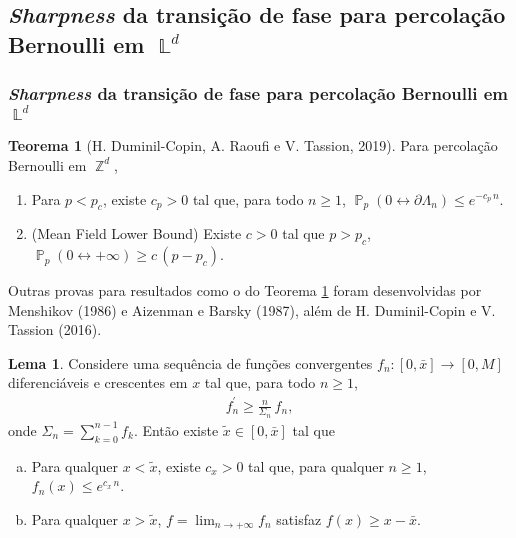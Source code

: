 \documentclass[9pt]{beamer}
\theoremstyle{definition} %
\newtheorem{mythm}{Teorema}
\newtheorem{mylem}{Lema}
\DeclareMathOperator{\PX}{\mathbb{P}} %
\DeclareMathOperator{\ZX}{\mathbb{Z}} %
\DeclareMathOperator{\LX}{\mathbb{L}} %
\begin{document}
	\subsection{\textit{Sharpness} da transição de fase para percolação Bernoulli em $\LX^d$}
	\begin{frame}[t]
		\frametitle{\textit{Sharpness} da transição de fase para percolação Bernoulli em $\LX^d$}
		\begin{mythm}[H. Duminil-Copin, A. Raoufi e V. Tassion, 2019]\label{thm:decai-exp}
			Para percolação Bernoulli em $\ZX^d$,
			\begin{enumerate}
				\item Para $p < p_c$, existe $c_p > 0$ tal que, para todo $n \geq 1$, $\PX_p(0 \leftrightarrow \partial\Lambda_n) \leq e^{-c_p \, n}$.
				\item (Mean Field Lower Bound) Existe $c > 0$ tal que $p > p_c$, $\PX_p(0 \leftrightarrow +\infty) \geq c\,(p - p_c)$.
			\end{enumerate}
		\end{mythm}
		\vspace{-3pt}
		Outras provas para resultados como o do Teorema \ref{thm:decai-exp} foram desenvolvidas por Menshikov (1986) e Aizenman e Barsky (1987), além de H. Duminil-Copin e V. Tassion (2016).\pause
		\begin{mylem}\label{lem:analise}
			Considere uma sequência de funções convergentes $f_n: [0, \bar{x}] \to [0, M]$ diferenciáveis e crescentes em $x$ tal que, para todo $n \geq 1$,
			\vspace{-3pt}
			\begin{align*}
			f_n^{\prime} \geq \frac{n}{\Sigma_n} \, f_n,
			\end{align*}\vspace{-6pt}
			onde $\Sigma_n = \sum_{k = 0}^{n - 1}f_k$. Então existe $\tilde{x} \in [0, \bar{x}]$ tal que
			\begin{enumerate}[a.]
				\item Para qualquer $x < \tilde{x}$, existe $c_x > 0$ tal que, para qualquer $n \geq 1$, $f_n(x) \leq e^{c_x\,n}$.
				\item Para qualquer $x > \tilde{x}$, $f = \lim_{n \to +\infty} f_n$ satisfaz $f(x) \geq x - \bar{x}$.
			\end{enumerate}
		\end{mylem}
	\end{frame}
\end{document}
